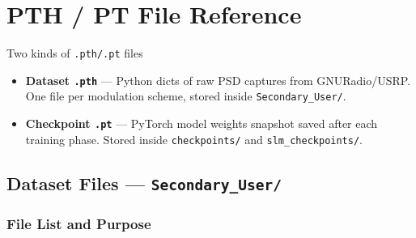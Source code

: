 \documentclass[11pt,a4paper]{article}
\begin{document}
\section{PTH / PT File Reference}

\begin{idea}{Two kinds of \texttt{.pth/.pt} files}
\begin{itemize}[nosep]
  \item \textbf{Dataset \texttt{.pth}} — Python dicts of raw PSD captures
        from GNURadio/USRP. One file per modulation scheme, stored inside
        \texttt{Secondary\_User/}.
  \item \textbf{Checkpoint \texttt{.pt}} — PyTorch model weights snapshot
        saved after each training phase. Stored inside
        \texttt{checkpoints/} and \texttt{slm\_checkpoints/}.
\end{itemize}
\end{idea}

\subsection{Dataset Files — \texttt{Secondary\_User/}}

\subsubsection{File List and Purpose}
\end{document}
